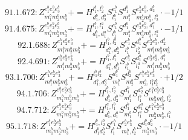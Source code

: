 \documentclass[letterpaper,10pt,fleqn,leqno,onecolumn]{article}
\begin{document}
\begin{equation} \;\;\;\;\;\;  91.1.672: Z^{e_{1}^{b}e_{2}^{b}e_{3}^{b}}_{m_{1}^{b}m_{2}^{b}m_{3}^{b}}+=H^{l_{1}^{b},l_{2}^{b}}_{d_{1}^{b},d_{2}^{b}}S^{e_{1}^{b}}_{l_{1}^{b}}S^{d_{1}^{b}}_{m_{1}^{b}}S^{e_{2}^{b}e_{3}^{b},d_{2}^{b}}_{m_{2}^{b}m_{3}^{b},l_{2}^{b}}\cdot -1/1 \end{equation}
\begin{equation} \;\;\;\;\;\;  91.4.675: Z^{e_{1}^{b}e_{2}^{b}e_{3}^{b}}_{m_{1}^{b}m_{2}^{b}m_{3}^{b}}+=H^{l_{1}^{b},l_{1}^{a}}_{d_{1}^{b},d_{1}^{a}}S^{e_{1}^{b}}_{l_{1}^{b}}S^{d_{1}^{b}}_{m_{1}^{b}}S^{e_{2}^{b}e_{3}^{b},d_{1}^{a}}_{m_{2}^{b}m_{3}^{b},l_{1}^{a}}\cdot -1/1 \end{equation}
\begin{equation} \;\;\;\;\;\;  92.1.688: Z^{e_{1}^{b}e_{2}^{b}e_{3}^{b}}_{m_{1}^{b}m_{2}^{b}m_{3}^{b}}+=H^{l_{1}^{b},l_{2}^{b}}_{d_{1}^{b},d_{2}^{b}}S^{e_{1}^{b}}_{l_{1}^{b}}S^{d_{1}^{b}}_{l_{2}^{b}}S^{e_{2}^{b}e_{3}^{b},d_{2}^{b}}_{m_{1}^{b}m_{2}^{b}m_{3}^{b}} \end{equation}
\begin{equation} \;\;\;\;\;\;  92.4.691: Z^{e_{1}^{b}e_{2}^{b}e_{3}^{b}}_{m_{1}^{b}m_{2}^{b}m_{3}^{b}}+=H^{l_{1}^{b},l_{1}^{a}}_{d_{1}^{a},d_{1}^{b}}S^{e_{1}^{b}}_{l_{1}^{b}}S^{d_{1}^{a}}_{l_{1}^{a}}S^{e_{2}^{b}e_{3}^{b},d_{1}^{b}}_{m_{1}^{b}m_{2}^{b}m_{3}^{b}} \end{equation}
\begin{equation} \;\;\;\;\;\;  93.1.700: Z^{e_{1}^{b}e_{2}^{b}e_{3}^{b}}_{m_{1}^{b}m_{2}^{b}m_{3}^{b}}+=H^{l_{1}^{b}l_{2}^{b}}_{d_{1}^{b},d_{2}^{b}}S^{d_{1}^{b}}_{m_{1}^{b}}S^{d_{2}^{b}}_{m_{2}^{b}}S^{e_{1}^{b}e_{2}^{b}e_{3}^{b}}_{m_{3}^{b},l_{1}^{b}l_{2}^{b}}\cdot +1/2 \end{equation}
\begin{equation} \;\;\;\;\;\;  94.1.706: Z^{e_{1}^{b}e_{2}^{b}e_{3}^{b}}_{m_{1}^{b}m_{2}^{b}m_{3}^{b}}+=H^{l_{1}^{b},l_{2}^{b}}_{d_{1}^{b},d_{2}^{b}}S^{d_{1}^{b}}_{m_{1}^{b}}S^{d_{2}^{b}}_{l_{1}^{b}}S^{e_{1}^{b}e_{2}^{b}e_{3}^{b}}_{m_{2}^{b}m_{3}^{b},l_{2}^{b}} \end{equation}
\begin{equation} \;\;\;\;\;\;  94.7.712: Z^{e_{1}^{b}e_{2}^{b}e_{3}^{b}}_{m_{1}^{b}m_{2}^{b}m_{3}^{b}}+=H^{l_{1}^{a},l_{1}^{b}}_{d_{1}^{b},d_{1}^{a}}S^{d_{1}^{b}}_{m_{1}^{b}}S^{d_{1}^{a}}_{l_{1}^{a}}S^{e_{1}^{b}e_{2}^{b}e_{3}^{b}}_{m_{2}^{b}m_{3}^{b},l_{1}^{b}} \end{equation}
\begin{equation} \;\;\;\;\;\;  95.1.718: Z^{e_{1}^{b}e_{2}^{b}e_{3}^{b}}_{m_{1}^{b}m_{2}^{b}m_{3}^{b}}+=H^{l_{1}^{b},l_{2}^{b}}_{d_{1}^{b}d_{2}^{b}}S^{e_{1}^{b}}_{l_{1}^{b}}S^{e_{2}^{b}e_{3}^{b}}_{m_{1}^{b},l_{2}^{b}}S^{d_{1}^{b}d_{2}^{b}}_{m_{2}^{b}m_{3}^{b}}\cdot -1/1 \end{equation}
\end{document}
